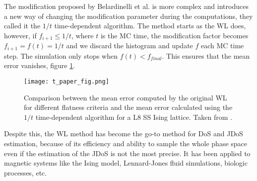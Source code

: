 The modification proposed by Belardinelli et al. is more complex and introduces a new way of changing the modification parameter during the computations, they called it the $1/t$ time-dependent algorithm. The method starts as the WL does, however, if $f_{i+1} \leqslant 1/t$, where $t$ is the MC time, the modification factor becomes $f_{i+1} = f(t) = 1/t$ and we discard the histogram and update $f$ each MC time step. The simulation only stops when $f(t) < f_{final}$. This ensures that the mean error vanishes, figure \ref{t_algorithm}.

\begin{figure}[h]
	\centering
	\texttt{[image: t\_paper\_fig.png]}
	\caption{Comparison between the mean error computed by the original WL for different flatness criteria and the mean error calculated using the $1/t$ time-dependent algorithm for a L8 SS Ising lattice. Taken from .}
	\label{t_algorithm}
\end{figure}

Despite this, the WL method has become the go-to method for DoS and JDoS estimation, because of its efficiency and ability to sample the whole phase space even if the estimation of the JDoS is not the most precise. It has been applied to magnetic systems like the Ising model, Lennard-Jones fluid simulations, biologic processes, etc.












